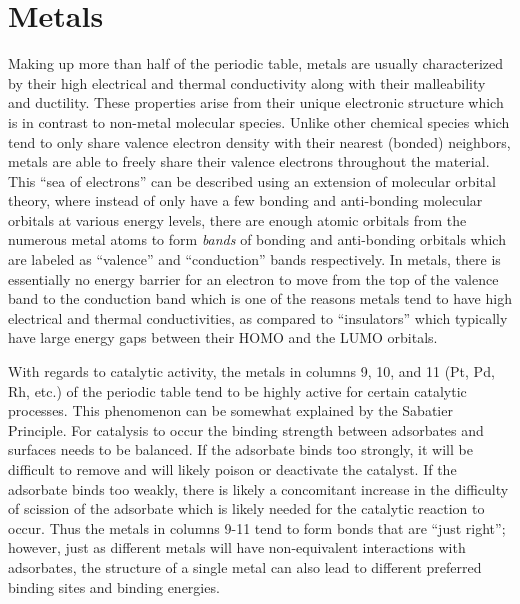 \section{Metals}
Making up more than half of the periodic table, metals are usually
characterized by their high electrical and thermal conductivity along with
their malleability and ductility. These properties arise from their unique
electronic structure which is in contrast to non-metal molecular species.
Unlike other chemical species which tend to only share valence electron density
with their nearest (bonded) neighbors, metals are able to freely share their
valence electrons throughout the material.  This ``sea of electrons'' can be
described using an extension of molecular orbital theory, where instead of only
have a few bonding and anti-bonding molecular orbitals at various energy
levels, there are enough atomic orbitals from the numerous metal atoms to form
{\em bands} of bonding and anti-bonding orbitals which are labeled as
``valence'' and ``conduction'' bands respectively. In metals, there is
essentially no energy barrier for an electron to move from the top of the
valence band to the conduction band which is one of the reasons metals tend to
have high electrical and thermal conductivities, as compared to ``insulators''
which typically have large energy gaps between their HOMO and the LUMO
orbitals.


With regards to catalytic activity, the metals in columns 9, 10, and 11 (Pt,
Pd, Rh, etc.) of the periodic table tend to be highly active for certain
catalytic processes. This phenomenon can be somewhat explained by the Sabatier
Principle. For catalysis to occur the binding strength between
adsorbates and surfaces needs to be balanced. If the adsorbate binds too
strongly, it will be difficult to remove and will likely poison or deactivate
the catalyst. If the adsorbate binds too weakly, there is likely a concomitant
increase in the difficulty of scission of the adsorbate which is likely needed
for the catalytic reaction to occur. Thus the metals in columns 9-11 tend to
form bonds that are ``just right''; however, just as different metals will have
non-equivalent interactions with adsorbates, the structure of a single metal
can also lead to different preferred binding sites and binding energies.


